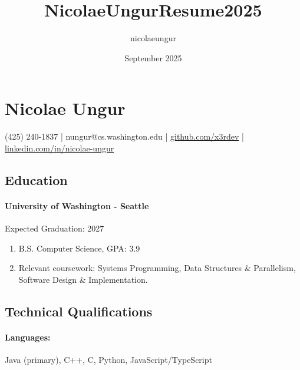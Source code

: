 \documentclass{article}
\title{NicolaeUngurResume2025}
\author{nicolaeungur}
\date{September 2025}
\begin{document}
\section*{Nicolae Ungur}\vspace{-0.75em}
\begin{flushleft}
    (425) 240-1837 | nungur@cs.washington.edu | \href{https://github.com/x3rdev}{github.com/x3rdev} | \href{https://linkedin.com/in/nicolae-ungur}{linkedin.com/in/nicolae-ungur}
\end{flushleft}
\vspace{-1.5em}

\subsection*{Education}\vspace{-0.75em}\hrulefill\vspace{-1em}
\paragraph{University of Washington - Seattle}\hfill Expected Graduation: 2027
\begin{enumerate}[label=$\bullet$]
    \item B.S. Computer Science, GPA: 3.9
    \item Relevant coursework: Systems Programming, Data Structures \& Parallelism, Software Design \& Implementation.
\end{enumerate}\vspace{-1.25em}

\subsection*{Technical Qualifications}\vspace{-0.75em}\hrulefill\vspace{-1.0em}
\paragraph{Languages:} Java (primary), C++, C, Python, JavaScript/TypeScript
\vspace{-0.75em}
\end{document}
